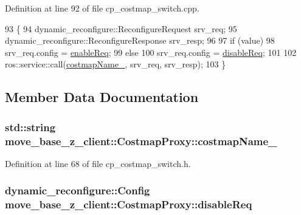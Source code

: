 Definition at line 92 of file cp\+\_\+costmap\+\_\+switch.\+cpp.


\begin{DoxyCode}
93 \{
94     dynamic\_reconfigure::ReconfigureRequest srv\_req;
95     dynamic\_reconfigure::ReconfigureResponse srv\_resp;
96 
97     \textcolor{keywordflow}{if} (value)
98         srv\_req.config = \hyperlink{classmove__base__z__client_1_1CostmapProxy_a8839c249af6a53a7dc8f2672966cbbae}{enableReq};
99     \textcolor{keywordflow}{else}
100         srv\_req.config = \hyperlink{classmove__base__z__client_1_1CostmapProxy_a3b7933e704ce9bab4061d6902d0e961a}{disableReq};
101 
102     ros::service::call(\hyperlink{classmove__base__z__client_1_1CostmapProxy_a842fd8c5d276df96e20be8fdbda5c4aa}{costmapName\_}, srv\_req, srv\_resp);
103 \}
\end{DoxyCode}


\subsection{Member Data Documentation}
\subsubsection[{\texorpdfstring{costmap\+Name\+\_\+}{costmapName_}}]{\setlength{\rightskip}{0pt plus 5cm}std\+::string move\+\_\+base\+\_\+z\+\_\+client\+::\+Costmap\+Proxy\+::costmap\+Name\+\_\+\hspace{0.3cm}{\ttfamily [private]}}\hypertarget{classmove__base__z__client_1_1CostmapProxy_a842fd8c5d276df96e20be8fdbda5c4aa}{}\label{classmove__base__z__client_1_1CostmapProxy_a842fd8c5d276df96e20be8fdbda5c4aa}


Definition at line 68 of file cp\+\_\+costmap\+\_\+switch.\+h.

\subsubsection[{\texorpdfstring{disable\+Req}{disableReq}}]{\setlength{\rightskip}{0pt plus 5cm}dynamic\+\_\+reconfigure\+::\+Config move\+\_\+base\+\_\+z\+\_\+client\+::\+Costmap\+Proxy\+::disable\+Req\hspace{0.3cm}{\ttfamily [private]}}\hypertarget{classmove__base__z__client_1_1CostmapProxy_a3b7933e704ce9bab4061d6902d0e961a}{}\label{classmove__base__z__client_1_1CostmapProxy_a3b7933e704ce9bab4061d6902d0e961a}


